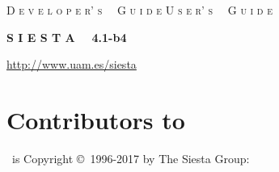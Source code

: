 


\date{July 5, 2017}




\begin{titlepage}

\begin{center}

\vspace{1cm}
\ifdeveloper
 {\Huge \textsc{D e v e l o p e r' s \, \, G u i d e}}
\else
 {\Huge \textsc{U s e r' s \, \, G u i d e}}
\fi

\vspace{1cm}
\hrulefill
\vspace{1cm}

{\Huge \textbf{S I E S T A \, \, 4.1-b4}}

\vspace{1cm}
\hrulefill
\vspace{0.5cm}

{\Large \printdate}

\vspace{1.5cm}
{\Large \url{http://www.uam.es/siesta}}

\end{center}

\end{titlepage}


\newpage


\section*{Contributors to \siesta}

\siesta\ is Copyright \copyright\  1996-2017 by The Siesta Group:
\vspace{0.5cm}

